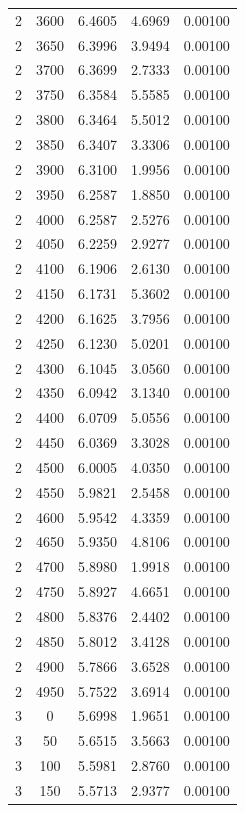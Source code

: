 \begin{longtable}{ccccc}
    2 & 3600 & 6.4605 & 4.6969 & 0.00100 \\
    2 & 3650 & 6.3996 & 3.9494 & 0.00100 \\
    2 & 3700 & 6.3699 & 2.7333 & 0.00100 \\
    2 & 3750 & 6.3584 & 5.5585 & 0.00100 \\
    2 & 3800 & 6.3464 & 5.5012 & 0.00100 \\
    2 & 3850 & 6.3407 & 3.3306 & 0.00100 \\
    2 & 3900 & 6.3100 & 1.9956 & 0.00100 \\
    2 & 3950 & 6.2587 & 1.8850 & 0.00100 \\
    2 & 4000 & 6.2587 & 2.5276 & 0.00100 \\
    2 & 4050 & 6.2259 & 2.9277 & 0.00100 \\
    2 & 4100 & 6.1906 & 2.6130 & 0.00100 \\
    2 & 4150 & 6.1731 & 5.3602 & 0.00100 \\
    2 & 4200 & 6.1625 & 3.7956 & 0.00100 \\
    2 & 4250 & 6.1230 & 5.0201 & 0.00100 \\
    2 & 4300 & 6.1045 & 3.0560 & 0.00100 \\
    2 & 4350 & 6.0942 & 3.1340 & 0.00100 \\
    2 & 4400 & 6.0709 & 5.0556 & 0.00100 \\
    2 & 4450 & 6.0369 & 3.3028 & 0.00100 \\
    2 & 4500 & 6.0005 & 4.0350 & 0.00100 \\
    2 & 4550 & 5.9821 & 2.5458 & 0.00100 \\
    2 & 4600 & 5.9542 & 4.3359 & 0.00100 \\
    2 & 4650 & 5.9350 & 4.8106 & 0.00100 \\
    2 & 4700 & 5.8980 & 1.9918 & 0.00100 \\
    2 & 4750 & 5.8927 & 4.6651 & 0.00100 \\
    2 & 4800 & 5.8376 & 2.4402 & 0.00100 \\
    2 & 4850 & 5.8012 & 3.4128 & 0.00100 \\
    2 & 4900 & 5.7866 & 3.6528 & 0.00100 \\
    2 & 4950 & 5.7522 & 3.6914 & 0.00100 \\
    3 & 0 & 5.6998 & 1.9651 & 0.00100 \\
    3 & 50 & 5.6515 & 3.5663 & 0.00100 \\
    3 & 100 & 5.5981 & 2.8760 & 0.00100 \\
    3 & 150 & 5.5713 & 2.9377 & 0.00100 \\

\end{longtable}
